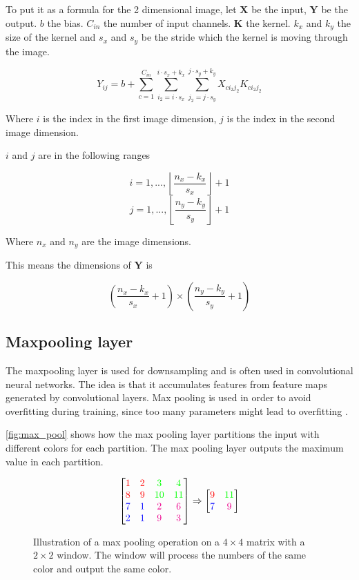 To put it as a formula for the 2 dimensional image,
let $\bm{X}$ be the input,
$\bm{Y}$ be the output.
$b$ the bias.
$C_{in}$ the number of input channels.
$\bm{K}$ the kernel.
$k_x$ and $k_y$ the size of the kernel and $s_x$ and $s_y$ be the stride which the kernel is moving through the image.

$$Y_{ij} = b + \sum^{C_{in}}_{c = 1} \sum^{i \cdot s_x + k_x}_{i_2 = i \cdot s_x} \sum^{j \cdot s_y + k_y}_{j_2 = j \cdot s_y} X_{ci_2j_2} K_{ci_2j_2} $$

Where $i$ is the index in the first image dimension, $j$ is the index in the second image dimension.

$i$ and $j$ are in the following ranges

$$i = 1, ..., \left\lfloor\frac{n_x - k_x}{s_x}\right\rfloor + 1$$
$$j = 1, ..., \left\lfloor\frac{n_y - k_y}{s_y}\right\rfloor + 1$$

Where $n_x$ and $n_y$ are the image dimensions.

This means the dimensions of $\bm{Y}$ is

$$\left(\frac{n_x - k_x}{s_x} + 1\right) \times \left(\frac{n_y - k_y}{s_y} + 1\right) $$

\subsection{Maxpooling layer}

The maxpooling layer is used for downsampling and is often used in convolutional neural networks. The idea is that it accumulates features from feature maps generated by convolutional layers. Max pooling is used in order to avoid overfitting during training, since too many parameters might lead to overfitting \cite{maxpool_article}.

\autoref{fig:max_pool} shows how the max pooling layer partitions the input with different colors for each partition. The max pooling layer outputs the maximum value in each partition.

\begin{figure}[htpb]
    \centering
    $$\begin{bmatrix}
        \color{red}1 & \color{red} 2 & \color{green} 3 & \color{green} 4 \\
        \color{red}8 & \color{red}9 & \color{green}10 & \color{green}11 \\
        \color{blue}7 & \color{blue}1 & \color{magenta}2 & \color{magenta}6 \\
        \color{blue}2 & \color{blue}1 & \color{magenta}9 & \color{magenta}3
        \end{bmatrix} \Rightarrow \begin{bmatrix}
        \color{red}9 & \color{green}11 \\
        \color{blue}7 & \color{magenta}9
        \end{bmatrix}$$
    \caption{Illustration of a max pooling operation on a $4\times 4$ matrix with a $2\times 2$ window. The window will process the numbers of the same color and output the same color.}
    \label{fig:max_pool}
\end{figure}

